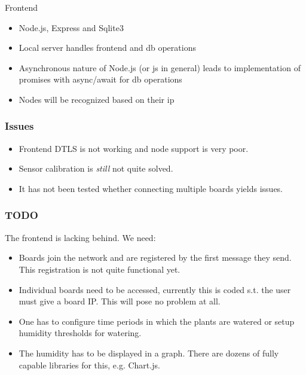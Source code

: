 \documentclass[10pt, xcolor=svgnames]{beamer}
\begin{document}
\begin{frame}{Frontend}
    \begin{itemize}
        \item Node.js, Express and Sqlite3
        \item Local server handles frontend and db operations
        \item Asynchronous nature of Node.js (or js in general) leads to implementation of promises with async/await for db operations
        \item Nodes will be recognized based on their ip
    \end{itemize}
\end{frame}

\begin{frame}
    \frametitle{Issues}

    \begin{itemize}
        \item Frontend DTLS is not working and node support is very poor.
        \item Sensor calibration is \emph{still} not quite solved.
        \item It has not been tested whether connecting multiple boards yields issues.
    \end{itemize}
\end{frame}

\begin{frame}
    \frametitle{TODO}

    The frontend is lacking behind. We need:

    \begin{itemize}
        \item Boards join the network and are registered by the first message they send. This registration is not quite functional yet.
        \item Individual boards need to be accessed, currently this is coded s.t. the user must give a board IP. This will pose no problem at all.
        \item One has to configure time periods in which the plants are watered or setup humidity thresholds for watering.
        \item The humidity has to be displayed in a graph. There are dozens of fully capable libraries for this, e.g. Chart.js.
    \end{itemize}
\end{frame}
\end{document}
